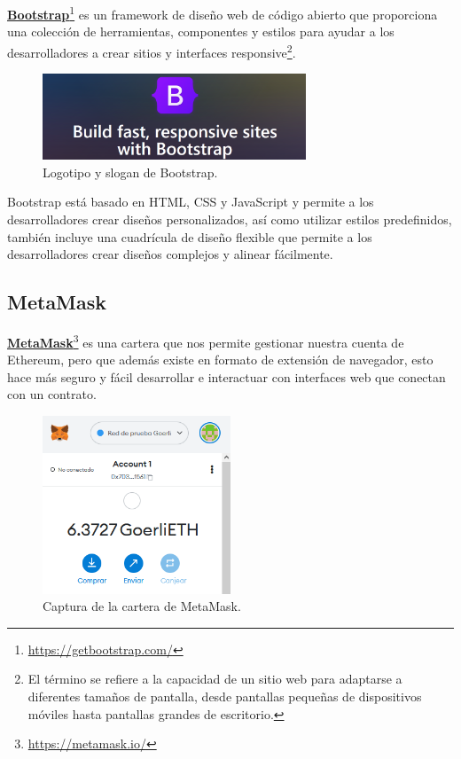 \textcolor{blue}{\href{https://getbootstrap.com/}{\textbf{Bootstrap}}}\footnote{\url{https://getbootstrap.com/}} es un framework de diseño web de código abierto que proporciona una colección de herramientas, componentes y estilos para ayudar a los desarrolladores a crear sitios y interfaces responsive\footnote{El término se refiere a la capacidad de un sitio web para adaptarse a diferentes tamaños de pantalla, desde pantallas pequeñas de dispositivos móviles hasta pantallas grandes de escritorio.}.

\bigskip

\begin{figure}[H]
        \centering
        \includegraphics[width=0.7\textwidth]{img/capturas/bootstrap.png}
        \caption{Logotipo y slogan de Bootstrap.}
        \label{fig:configApi}
\end{figure}

\bigskip

Bootstrap está basado en HTML, CSS y JavaScript y permite a los desarrolladores crear diseños personalizados, así como utilizar estilos predefinidos, también incluye una cuadrícula de diseño flexible que permite a los desarrolladores crear diseños complejos y alinear fácilmente.

\newpage

\subsection{MetaMask}

\textcolor{blue}{\href{https://metamask.io/}{\textbf{MetaMask}}}\footnote{\url{https://metamask.io/}} es una cartera que nos permite gestionar nuestra cuenta de Ethereum, pero que además existe en formato de extensión de navegador, esto hace más seguro y fácil desarrollar e interactuar con interfaces web que conectan con un contrato.

\begin{figure}[H]
        \centering
        \includegraphics[width=0.5\textwidth]{img/capturas/metamask.png}
        \caption{Captura de la cartera de MetaMask.}
        \label{fig:configApi}
\end{figure}

